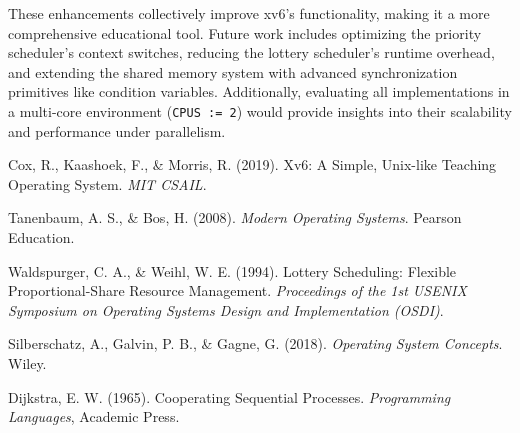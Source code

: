 \documentclass[12pt]{article}
\begin{document}
These enhancements collectively improve xv6’s functionality, making it a more comprehensive educational tool. Future work includes optimizing the priority scheduler’s context switches, reducing the lottery scheduler’s runtime overhead, and extending the shared memory system with advanced synchronization primitives like condition variables. Additionally, evaluating all implementations in a multi-core environment (\texttt{CPUS := 2}) would provide insights into their scalability and performance under parallelism.

\begin{thebibliography}{9}
Cox, R., Kaashoek, F., \& Morris, R. (2019). Xv6: A Simple, Unix-like Teaching Operating System. \textit{MIT CSAIL}.

Tanenbaum, A. S., \& Bos, H. (2008). \textit{Modern Operating Systems}. Pearson Education.

Waldspurger, C. A., \& Weihl, W. E. (1994). Lottery Scheduling: Flexible Proportional-Share Resource Management. \textit{Proceedings of the 1st USENIX Symposium on Operating Systems Design and Implementation (OSDI)}.

Silberschatz, A., Galvin, P. B., \& Gagne, G. (2018). \textit{Operating System Concepts}. Wiley.

Dijkstra, E. W. (1965). Cooperating Sequential Processes. \textit{Programming Languages}, Academic Press.
\end{thebibliography}
\end{document}
